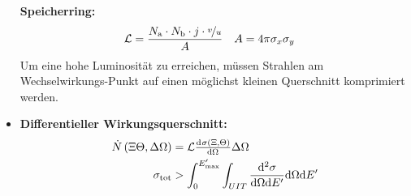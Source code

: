 \documentclass[BCOR=5mm,DIV=calc,listof=totoc,headings=big]{scrartcl}
\newcommand{\de}{\mathrm{d}}
\begin{document}
\begin{itemize}
  \textbf{Speicherring:}
  \begin{align*}
    \mathcal{L}&=\frac{N_{\mathrm{a}} \cdot N_{\mathrm{b}} \cdot j
      \cdot \nicefrac{v}{u}}{A} & A&=4\pi \sigma_{x} \sigma_{y}
  \end{align*}
  Um eine hohe Luminosität zu erreichen, müssen Strahlen am
  Wechselwirkungs-Punkt auf einen möglichst kleinen Querschnitt
  komprimiert werden.
\item \textbf{Differentieller Wirkungsquerschnitt:}
  \begin{align*}
    \dot{N}\del{\Xi \Theta, \Delta \Omega}&=\mathcal{L}
    \od{\sigma(\Xi, \Theta)}{\Omega}\Delta \Omega\\
    \sigma_{\text{tot}}&>\int_{0}^{E^{\prime}_{\text{max}}}\int_{UIT} \frac{\de
   ^{2}\sigma}{\de\Omega\de E^{\prime}}\de\Omega\de E^{\prime}
  \end{align*}
\end{itemize}
\end{document}
